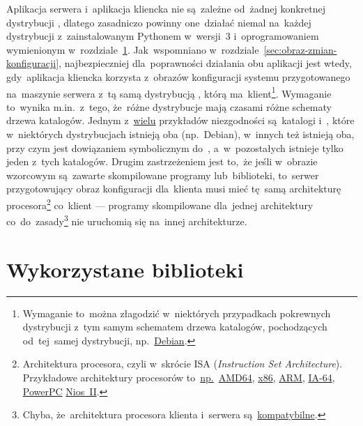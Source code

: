 \documentclass[thesis]{subfiles}
\begin{document}
Aplikacja serwera i~aplikacja kliencka nie są~zależne od~żadnej konkretnej dystrybucji , dlatego zasadniczo powinny one~działać niemal na~każdej dystrybucji z~zainstalowanym Pythonem w~wersji~3 i~oprogramowaniem wymienionym w~rozdziale~\ref{sec:wykorzystane-oprogramowanie}. Jak~wspomniano w~rozdziale~\ref{sec:obraz-zmian-konfiguracji}, najbezpieczniej dla~poprawności działania obu aplikacji jest wtedy, gdy~aplikacja kliencka korzysta z~obrazów konfiguracji systemu przygotowanego na~maszynie serwera z~tą samą dystrybucją , którą ma~klient\footnote{Wymaganie to~można złagodzić w~niektórych przypadkach pokrewnych dystrybucji z~tym samym schematem drzewa katalogów, pochodzących od~tej~samej dystrybucji, np.~\href{https://en.wikipedia.org/wiki/Debian}{Debian}.}. Wymaganie to~wynika m.in.~z~tego, że~różne dystrybucje mają czasami różne schematy drzewa katalogów. Jednym z~\href{https://en.wikipedia.org/wiki/Filesystem_Hierarchy_Standard#FHS_compliance}{wielu} przykładów niezgodności są~katalogi  i~, które w~niektórych dystrybucjach istnieją oba (np.~Debian), w~innych też istnieją oba, przy czym  jest dowiązaniem symbolicznym do~, a~w~pozostałych istnieje tylko jeden z~tych katalogów. Drugim zastrzeżeniem jest to,~że jeśli w~obrazie wzorcowym są~zawarte skompilowane programy lub~biblioteki, to~serwer przygotowujący obraz konfiguracji dla~klienta musi mieć tę~samą architekturę procesora\footnote{Architektura procesora, czyli w~skrócie ISA (\emph{Instruction Set Architecture}). Przykładowe architektury procesorów to~\href{https://en.wikipedia.org/wiki/List_of_instruction_sets}{np.}~\href{https://en.wikipedia.org/wiki/X86-64}{AMD64}, \href{https://en.wikipedia.org/wiki/X86}{x86}, \href{https://en.wikipedia.org/wiki/ARM_architecture}{ARM}, \href{https://en.wikipedia.org/wiki/IA-64}{IA-64}, \href{https://en.wikipedia.org/wiki/PowerPC}{PowerPC} \href{https://en.wikipedia.org/wiki/Nios_II}{Nios~II}.} co~klient --- programy skompilowane dla~jednej architektury co~do~zasady\footnote{Chyba, że~architektura procesora klienta i~serwera są~\href{https://en.wikipedia.org/wiki/X86-64\#OPMODES}{kompatybilne}.} nie uruchomią się na~innej architekturze.


\section{Wykorzystane biblioteki}
\label{sec:wykorzystane-oprogramowanie}
\end{document}
